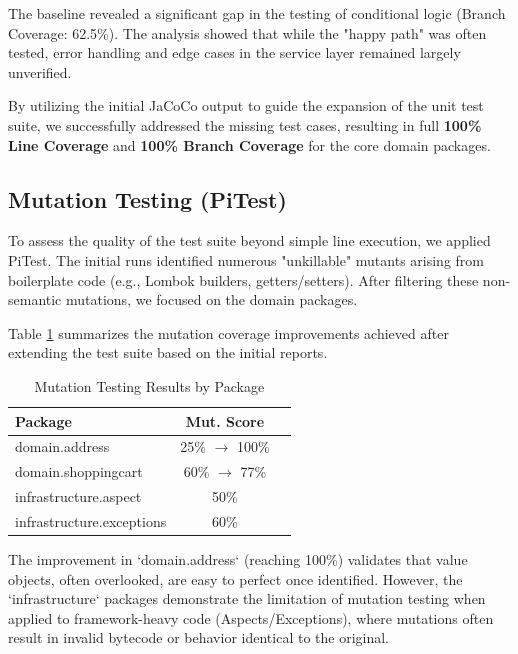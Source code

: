 The baseline revealed a significant gap in the testing of conditional logic (Branch Coverage: 62.5\%). The analysis showed that while the "happy path" was often tested, error handling and edge cases in the service layer remained largely unverified.

By utilizing the initial JaCoCo output to guide the expansion of the unit test suite, we successfully addressed the missing test cases, resulting in full \textbf{100\% Line Coverage} and \textbf{100\% Branch Coverage} for the core domain packages.

\subsection{Mutation Testing (PiTest)}
To assess the quality of the test suite beyond simple line execution, we applied PiTest. The initial runs identified numerous "unkillable" mutants arising from boilerplate code (e.g., Lombok builders, getters/setters). After filtering these non-semantic mutations, we focused on the domain packages.

Table \ref{tab:mutation} summarizes the mutation coverage improvements achieved after extending the test suite based on the initial reports.

\begin{table}[h]
    \centering
    \begin{tabular}{l c p{4cm}}
        \toprule
        \textbf{Package} & \textbf{Mut. Score} \\
        \midrule
        domain.address & 25\% $\rightarrow$ 100\% \\
        domain.shoppingcart & 60\% $\rightarrow$ 77\% \\
        infrastructure.aspect & 50\% \\
        infrastructure.exceptions & 60\% \\
        \bottomrule
    \end{tabular}
    \caption{Mutation Testing Results by Package}
    \label{tab:mutation}
\end{table}

The improvement in `domain.address` (reaching 100\%) validates that value objects, often overlooked, are easy to perfect once identified. However, the `infrastructure` packages demonstrate the limitation of mutation testing when applied to framework-heavy code (Aspects/Exceptions), where mutations often result in invalid bytecode or behavior identical to the original.

